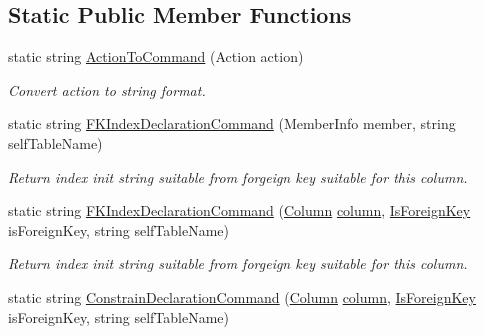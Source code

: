 \subsection*{Static Public Member Functions}
\begin{DoxyCompactItemize}
\item 
static string \mbox{\hyperlink{class_uniform_data_operator_1_1_sql_1_1_tables_1_1_attributes_1_1_is_foreign_key_a821e87bb1efc4b7cf34baf7d1d856824}{Action\+To\+Command}} (Action action)
\begin{DoxyCompactList}\small\item\em Convert action to string format. \end{DoxyCompactList}\item 
static string \mbox{\hyperlink{class_uniform_data_operator_1_1_sql_1_1_tables_1_1_attributes_1_1_is_foreign_key_a467cddeb5f6467ba51e90931c371e36c}{F\+K\+Index\+Declaration\+Command}} (Member\+Info member, string self\+Table\+Name)
\begin{DoxyCompactList}\small\item\em Return index init string suitable from forgeign key suitable for this column. \end{DoxyCompactList}\item 
static string \mbox{\hyperlink{class_uniform_data_operator_1_1_sql_1_1_tables_1_1_attributes_1_1_is_foreign_key_a32a5ab86d0bbd36adfadd745e8e42087}{F\+K\+Index\+Declaration\+Command}} (\mbox{\hyperlink{class_uniform_data_operator_1_1_sql_1_1_tables_1_1_attributes_1_1_column}{Column}} \mbox{\hyperlink{class_uniform_data_operator_1_1_sql_1_1_tables_1_1_attributes_1_1_is_foreign_key_ac72b1494342f1c0d0c3241a142d18e46}{column}}, \mbox{\hyperlink{class_uniform_data_operator_1_1_sql_1_1_tables_1_1_attributes_1_1_is_foreign_key}{Is\+Foreign\+Key}} is\+Foreign\+Key, string self\+Table\+Name)
\begin{DoxyCompactList}\small\item\em Return index init string suitable from forgeign key suitable for this column. \end{DoxyCompactList}\item 
static string \mbox{\hyperlink{class_uniform_data_operator_1_1_sql_1_1_tables_1_1_attributes_1_1_is_foreign_key_acb7820f8c51d0db5699080495cb97900}{Constrain\+Declaration\+Command}} (\mbox{\hyperlink{class_uniform_data_operator_1_1_sql_1_1_tables_1_1_attributes_1_1_column}{Column}} \mbox{\hyperlink{class_uniform_data_operator_1_1_sql_1_1_tables_1_1_attributes_1_1_is_foreign_key_ac72b1494342f1c0d0c3241a142d18e46}{column}}, \mbox{\hyperlink{class_uniform_data_operator_1_1_sql_1_1_tables_1_1_attributes_1_1_is_foreign_key}{Is\+Foreign\+Key}} is\+Foreign\+Key, string self\+Table\+Name)

\end{DoxyCompactItemize}
